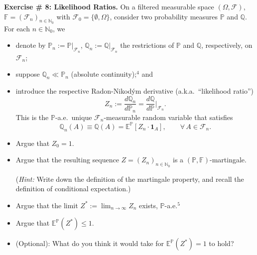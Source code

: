 \textbf{Exercise \# 8: Likelihood Ratios.} On a filtered measurable space $(\Omega, \mathcal{F})$, $\mathbb{F} = \left(\mathcal{F}_n\right)_{n \in \mathbb{N}_0}$ with $\mathcal{F}_0 = \{\emptyset, \Omega\}$, consider two probability measures $\mathbb{P}$ and $\mathbb{Q}$. For each $n \in \mathbb{N}_0$, we
\begin{itemize}
    \item[$\cdot$] denote by $\mathbb{P}_n := \mathbb{P}\big|_{\mathcal{F}_n}$, $\mathbb{Q}_n := \mathbb{Q}\big|_{\mathcal{F}_n}$ the restrictions of $\mathbb{P}$ and $\mathbb{Q}$, respectively, on $\mathcal{F}_n$;
    \item[$\cdot$] suppose $\mathbb{Q}_n \ll \mathbb{P}_n$ (absolute continuity);$^4$ and
    \item[$\cdot$] introduce the respective Radon-Nikod\'ym derivative (a.k.a.\ ``likelihood ratio'')
    \[
        Z_n := \frac{d\mathbb{Q}_n}{d\mathbb{P}_n} = \frac{d\mathbb{Q}}{d\mathbb{P}}\bigg|_{\mathcal{F}_n}.
    \]
    This is the $\mathbb{P}$-a.e.\ unique $\mathcal{F}_n$-measurable random variable that satisfies
    \begin{equation}
        \mathbb{Q}_n(A) \equiv \mathbb{Q}(A) = \mathbb{E}^{\mathbb{P}}\!\left[Z_n \cdot \mathbf{1}_A\right], \qquad \forall\, A \in \mathcal{F}_n.
    \end{equation}
\end{itemize}

\begin{itemize}
    \item[(i)] Argue that $Z_0 = 1$.

    \item[(ii)] Argue that the resulting sequence $Z = \left(Z_n\right)_{n \in \mathbb{N}_0}$ is a $(\mathbb{P}, \mathbb{F})$-martingale.

    (\textit{Hint:} Write down the definition of the martingale property, and recall the definition of conditional expectation.)

    \item[(iii)] Argue that the limit $Z^* := \lim_{n \to \infty} Z_n$ exists, $\mathbb{P}$-a.e.$^5$

    \item[(iv)] Argue that $\mathbb{E}^{\mathbb{P}}(Z^*) \leq 1$.

    \item[(v)$^*$] (Optional): What do you think it would take for $\mathbb{E}^{\mathbb{P}}(Z^*) = 1$ to hold?
\end{itemize}


